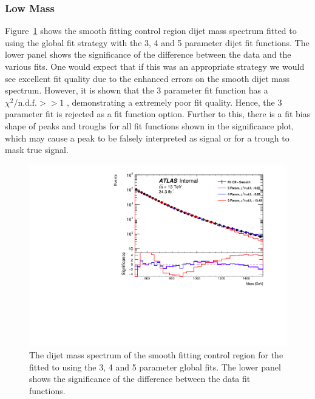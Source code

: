 \subsubsection{Low Mass}
\label{sec:lowmass_globalFit}

Figure~\ref{fig:lowmass_globalFit} shows the smooth fitting control region dijet mass spectrum fitted to
using the global fit strategy with the 3, 4 and 5 parameter dijet fit functions.
The lower panel shows the significance of the difference between the data and the various fits.
One would expect that if this was an appropriate strategy we would see excellent fit quality due to the enhanced errors on the smooth dijet mass spectrum.
However, it is shown that the 3 parameter fit function has a $\chi^{2}/\text{n.d.f.} >> 1$ , demonstrating a extremely poor fit quality.
Hence, the 3 parameter fit is rejected as a fit function option.
Further to this, there is a fit bias shape of peaks and troughs for all fit functions shown in the significance plot,
which may cause a peak to be falsely interpreted as signal or for a trough to mask true signal. 

\begin{figure}[!htb]
\centering
\includegraphics[scale=0.5, angle=0]{figs/Dibjet/LowMass/FitStudy/globalFit_lm_dH.pdf}
\vspace{10pt}
\caption{\label{fig:lowmass_globalFit}
  The dijet mass spectrum of the smooth fitting control region for the \lm{}
  fitted to using the 3, 4 and 5 parameter global fits.
  The lower panel shows the significance of the difference between the data fit functions.}
\end{figure}

